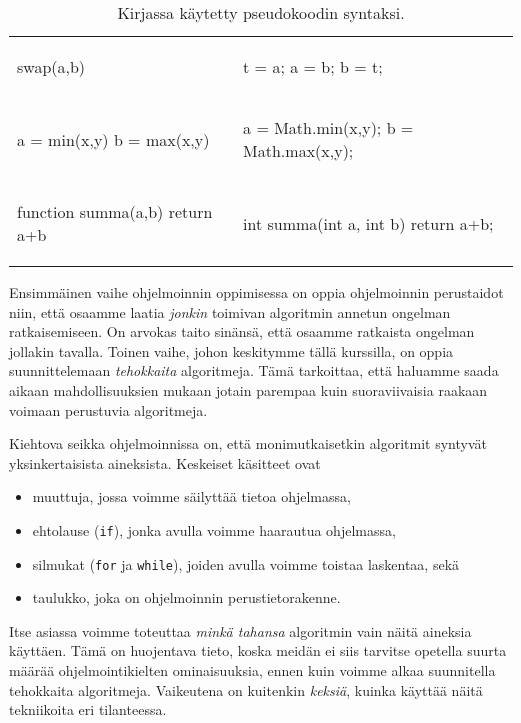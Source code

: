 \begin{table}
\begin{tabular}{ll}
\begin{smallcode}[xleftmargin=0pt]
swap(a,b)
\end{smallcode}
&
\begin{smallcode}
t = a;
a = b;
b = t;
\end{smallcode}
\\
\begin{smallcode}[xleftmargin=0pt]
a = min(x,y)
b = max(x,y)
\end{smallcode}
&
\begin{smallcode}
a = Math.min(x,y);
b = Math.max(x,y);
\end{smallcode}
\\
\begin{smallcode}[xleftmargin=0pt]
function summa(a,b)
    return a+b
\end{smallcode}
&
\begin{smallcode}
int summa(int a, int b) {
    return a+b;
}
\end{smallcode}
\\
\end{tabular}
\caption{Kirjassa käytetty pseudokoodin syntaksi.}
\label{tab:psekoo}
\end{table}

Ensimmäinen vaihe ohjelmoinnin oppimisessa on oppia
ohjelmoinnin perustaidot niin, että osaamme laatia
\emph{jonkin} toimivan algoritmin annetun ongelman ratkaisemiseen.
On arvokas taito sinänsä, että osaamme ratkaista
ongelman jollakin tavalla.
Toinen vaihe, johon keskitymme tällä kurssilla,
on oppia suunnittelemaan \emph{tehokkaita} algoritmeja.
Tämä tarkoittaa, että haluamme saada aikaan mahdollisuuksien mukaan
jotain parempaa kuin suoraviivaisia
raakaan voimaan perustuvia algoritmeja.

Kiehtova seikka ohjelmoinnissa on, että monimutkaisetkin algoritmit
syntyvät yksinkertaisista aineksista. Keskeiset käsitteet ovat

\begin{itemize}
\item muuttuja, jossa voimme säilyttää tietoa ohjelmassa,
\item ehtolause (\texttt{if}), jonka avulla voimme haarautua ohjelmassa,
\item silmukat (\texttt{for} ja \texttt{while}), joiden avulla voimme
toistaa laskentaa, sekä
\item taulukko, joka on ohjelmoinnin perustietorakenne.
\end{itemize}

Itse asiassa voimme toteuttaa \emph{minkä tahansa} algoritmin
vain näitä aineksia käyttäen.
Tämä on huojentava tieto, koska meidän ei siis tarvitse opetella
suurta määrää ohjelmointikielten ominaisuuksia,
ennen kuin voimme alkaa suunnitella tehokkaita algoritmeja.
Vaikeutena on kuitenkin \emph{keksiä}, kuinka käyttää näitä
tekniikoita eri tilanteessa.

